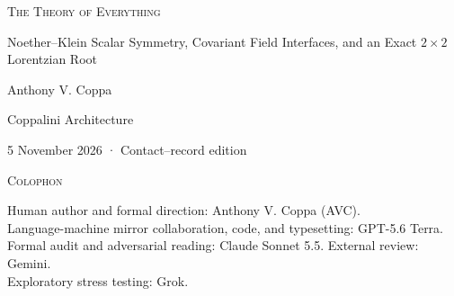 \documentclass[10pt]{article}
\theoremstyle{remark}
\begin{document}
\hypersetup{pageanchor=false}
\begin{titlepage}
\thispagestyle{empty}
\begin{center}
\vspace*{2.0in}
{\fontsize{26}{31}\selectfont\scshape The Theory of Everything\par}
\vspace{0.9em}
{\large Noether--Klein Scalar Symmetry, Covariant Field Interfaces, and an Exact \texorpdfstring{$2\times2$}{2x2} Lorentzian Root\par}
\vspace{2.5em}
{\normalsize Anthony V. Coppa\par}
{\small Coppalini Architecture\par}
\vspace{0.6em}
{\small 5 November 2026 · Contact--record edition\par}
\end{center}
\vfill
\begin{center}
\begin{minipage}{0.76\textwidth}
\centering\footnotesize
\textsc{Colophon}\par\smallskip
Human author and formal direction: Anthony V. Coppa (AVC).\\
Language-machine mirror collaboration, code, and typesetting: GPT-5.6 Terra.\\
Formal audit and adversarial reading: Claude Sonnet 5.5. External review: Gemini.\\
Exploratory stress testing: Grok.
\end{minipage}
\end{center}
\vspace*{0.34in}
\end{titlepage}
\hypersetup{pageanchor=true}
\setcounter{page}{1}


\end{document}
